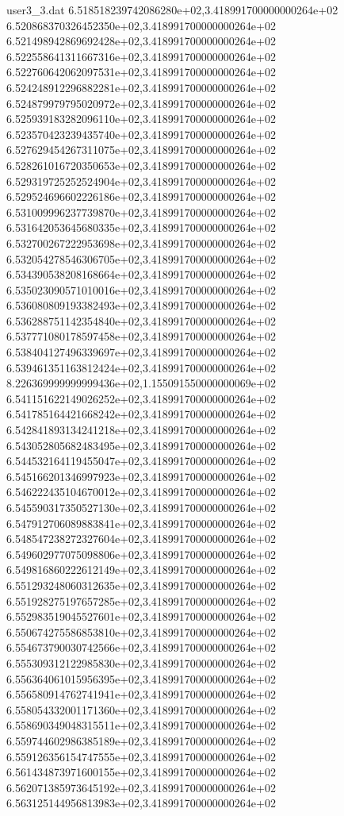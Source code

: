 \begin{filecontents}{user3_3.dat}
6.518518239742086280e+02,3.418991700000000264e+02
6.520868370326452350e+02,3.418991700000000264e+02
6.521498942869692428e+02,3.418991700000000264e+02
6.522558641311667316e+02,3.418991700000000264e+02
6.522760642062097531e+02,3.418991700000000264e+02
6.524248912296882281e+02,3.418991700000000264e+02
6.524879979795020972e+02,3.418991700000000264e+02
6.525939183282096110e+02,3.418991700000000264e+02
6.523570423239435740e+02,3.418991700000000264e+02
6.527629454267311075e+02,3.418991700000000264e+02
6.528261016720350653e+02,3.418991700000000264e+02
6.529319725252524904e+02,3.418991700000000264e+02
6.529524696602226186e+02,3.418991700000000264e+02
6.531009996237739870e+02,3.418991700000000264e+02
6.531642053645680335e+02,3.418991700000000264e+02
6.532700267222953698e+02,3.418991700000000264e+02
6.532054278546306705e+02,3.418991700000000264e+02
6.534390538208168664e+02,3.418991700000000264e+02
6.535023090571010016e+02,3.418991700000000264e+02
6.536080809193382493e+02,3.418991700000000264e+02
6.536288751142354840e+02,3.418991700000000264e+02
6.537771080178597458e+02,3.418991700000000264e+02
6.538404127496339697e+02,3.418991700000000264e+02
6.539461351163812424e+02,3.418991700000000264e+02
8.226369999999999436e+02,1.155091550000000069e+02
6.541151622149026252e+02,3.418991700000000264e+02
6.541785164421668242e+02,3.418991700000000264e+02
6.542841893134241218e+02,3.418991700000000264e+02
6.543052805682483495e+02,3.418991700000000264e+02
6.544532164119455047e+02,3.418991700000000264e+02
6.545166201346997923e+02,3.418991700000000264e+02
6.546222435104670012e+02,3.418991700000000264e+02
6.545590317350527130e+02,3.418991700000000264e+02
6.547912706089883841e+02,3.418991700000000264e+02
6.548547238272327604e+02,3.418991700000000264e+02
6.549602977075098806e+02,3.418991700000000264e+02
6.549816860222612149e+02,3.418991700000000264e+02
6.551293248060312635e+02,3.418991700000000264e+02
6.551928275197657285e+02,3.418991700000000264e+02
6.552983519045527601e+02,3.418991700000000264e+02
6.550674275586853810e+02,3.418991700000000264e+02
6.554673790030742566e+02,3.418991700000000264e+02
6.555309312122985830e+02,3.418991700000000264e+02
6.556364061015956395e+02,3.418991700000000264e+02
6.556580914762741941e+02,3.418991700000000264e+02
6.558054332001171360e+02,3.418991700000000264e+02
6.558690349048315511e+02,3.418991700000000264e+02
6.559744602986385189e+02,3.418991700000000264e+02
6.559126356154747555e+02,3.418991700000000264e+02
6.561434873971600155e+02,3.418991700000000264e+02
6.562071385973645192e+02,3.418991700000000264e+02
6.563125144956813983e+02,3.418991700000000264e+02

\end{filecontents}
